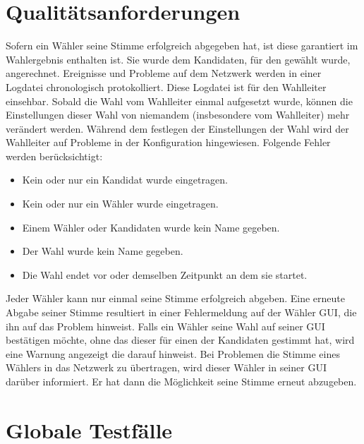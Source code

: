 \documentclass[parskip=full,11pt,twoside]{scrartcl}
\begin{document}
\section{Qualitätsanforderungen}
Sofern ein Wähler seine Stimme erfolgreich abgegeben hat, ist diese garantiert im Wahlergebnis enthalten ist. Sie wurde dem Kandidaten, für den gewählt wurde, angerechnet.
Ereignisse und Probleme auf dem \gls{Netzwerk} werden in einer \gls{Logdatei} chronologisch protokolliert. Diese \gls{Logdatei} ist für den \gls{Wahlleiter} einsehbar.
Sobald die Wahl vom \gls{Wahlleiter} einmal aufgesetzt wurde, können die Einstellungen dieser Wahl von niemandem (insbesondere vom \gls{Wahlleiter}) mehr verändert werden.
Während dem festlegen der Einstellungen der Wahl wird der \gls{Wahlleiter} auf Probleme in der \gls{Konfiguration} hingewiesen. Folgende Fehler werden berücksichtigt:
	\begin{itemize}
		\item Kein oder nur ein Kandidat wurde eingetragen.
		\item Kein oder nur ein Wähler wurde eingetragen.
		\item Einem Wähler oder Kandidaten wurde kein Name gegeben.
		\item Der Wahl wurde kein Name gegeben.
		\item Die Wahl endet vor oder demselben Zeitpunkt an dem sie startet.
	\end{itemize}
Jeder Wähler kann nur einmal seine Stimme erfolgreich abgeben. Eine erneute Abgabe seiner Stimme resultiert in einer Fehlermeldung auf der Wähler GUI, die ihn auf das Problem hinweist.
Falls ein Wähler seine Wahl auf seiner GUI bestätigen möchte, ohne das dieser für einen der Kandidaten gestimmt hat, wird eine Warnung angezeigt die darauf hinweist.
Bei Problemen die Stimme eines Wählers in das \gls{Netzwerk} zu übertragen, wird dieser Wähler in seiner GUI darüber informiert. Er hat dann die Möglichkeit seine Stimme erneut abzugeben. 

\section{Globale Testfälle}
\end{document}

